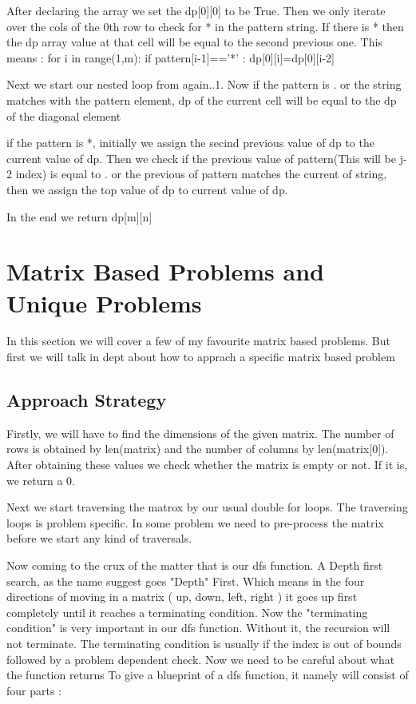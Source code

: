 \documentclass{article}
\newcommand{\nd}{\noindent}
\begin{document}
\nd After declaring the array we set the dp[0][0] to be True. Then we only iterate over the cols of the 0th row to check for * in the pattern string. If there is * then the dp array value at that cell will be equal to the second previous one. This means : for i in range(1,m): if pattern[i-1]=='*' : dp[0][i]=dp[0][i-2]  

\nd Next we start our nested loop from again..1. Now if the pattern is . or the string matches with the pattern element, dp of the current cell will be equal to the dp of the diagonal element 

\nd if the pattern is *, initially we assign the secind previous value of dp to the current value of dp. Then we check if the previous value of pattern(This will be j-2 index) is equal to . or the previous of pattern matches the current of string, then we assign the top value of dp to current value of dp. 

\nd In the end we return dp[m][n]
\section{ Matrix Based Problems and Unique Problems } 
In this section we will cover a few of my favourite matrix based problems. But first we will talk in dept about how to apprach a specific matrix based problem 

\subsection {Approach Strategy}
Firstly, we will have to find the dimensions of the given matrix. The number of rows is obtained by len(matrix) and the number of columns by len(matrix[0]). After obtaining these values we check whether the matrix is empty or not. If it is, we return a 0. 

\nd Next we start traversing the matrox by our usual double for loops. The traversing loops is problem specific. In some problem we need to pre-process the matrix before we start any kind of traversals. 


\nd Now coming to the crux of the matter that is our dfs function. A Depth first search, as the name suggest goes "Depth" First. Which means in the four directions of moving in a matrix ( up, down, left, right ) it goes up first completely until it reaches a terminating condition. Now the "terminating condition" is very important in our dfs function. Without it, the recursion will not terminate.  The terminating condition is usually if the index is out of bounds followed by a problem dependent check. Now we need to be careful about what the function returns 
\newpage
\nd To give a blueprint of a dfs function, it namely will consist of four parts : 
\end{document}
